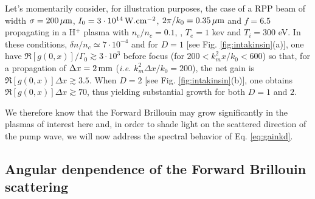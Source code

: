 \documentclass[
 reprint,
 amsmath,amssymb,
 aps,
]{revtex4-1}
\begin{document}
Let's momentarily consider, for illustration purposes,  the  case of a RPP beam of width $\sigma =200\,\rm\mu m$, $I_0=3\cdot 10^{14} \,\rm W.cm^{-2}$, $2\pi/k_0 = 0.35\,\rm\mu m$ and $f = 6.5$ propagating in a H$^{+}$ plasma with $n_e/n_c=0.1$, , $T_e=1$ kev and $T_i=300$ eV. In these conditions, $\delta n/n_c \simeq 7\cdot 10^{-4}$ and  for $D=1$ [see Fig. \ref{fig:intakinsin}(a)], one have $\Re[g(0,x)]/\Gamma_0 \gtrsim 3\cdot 10^3$ before focus (for $200< k_m^2 x/k_0 < 600$) so that, for  a propagation of $\Delta x = 2\,\rm mm$ (\emph{i.e.} $k_m^2 \Delta x/k_0 = 200$), the net gain is $\Re[g(0,x)]\Delta x\gtrsim 3.5 $. When $D=2$ [see Fig. \ref{fig:intakinsin}(b)], one obtains $\Re[g(0,x)]\Delta x\gtrsim 70 $, thus yielding substantial growth for both $D=1$ and $2$.

We therefore know that the Forward Brillouin may grow significantly in the plasmas  of interest here and, in order to shade light on the scattered  direction of the pump wave, we will now address the spectral behavior of Eq. \eqref{eq:gainkd}.

\subsection{Angular denpendence of the  Forward Brillouin scattering}
\end{document}
